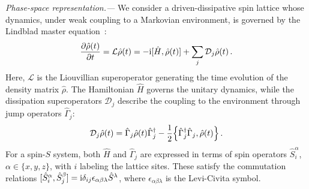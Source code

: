 \documentclass[aps,prl,twocolumn,superscriptaddress,english,floatfix]{revtex4-2}
\let\originalleft\left
\let\originalright\right
\renewcommand{\left}{\mathopen{}\mathclose\bgroup\originalleft}
\renewcommand{\right}{\aftergroup\egroup\originalright}
\def\rmi{{\rm {i}}}
\newcommand{\rhohat}{\hat{\rho}}
\newcommand{\Hhat}{\hat{H}}
\newcommand{\Shat}{\hat{S}}
\begin{document}
{\it Phase-space representation.---}
We consider a driven-dissipative spin lattice whose dynamics, under weak coupling to a Markovian environment, is governed by the Lindblad master equation~\cite{Breuer2002, Fazio2025}:
\begin{equation}\label{eq:Lindblad}
    \frac {\partial \hat \rho(t)} {\partial t} = \mathcal{L} \hat \rho(t) = - \rmi [\hat H, \hat \rho(t) ] + 
    \sum_j \mathcal{D}_j\hat \rho(t)\,.
\end{equation}
Here, $\mathcal L$ is the Liouvillian superoperator generating the time evolution of the density matrix $\rhohat$. The Hamiltonian $\hat H$ governs the unitary dynamics, while the dissipation superoperators $\mathcal { D}_j$ describe the coupling to the environment through jump operators $\hat \Gamma_j$:
\begin{equation}\label{eq:dissipation}
    \mathcal{ D}_j {\hat \rho(t)}=
 {\hat \Gamma_{j}} {\hat \rho(t)} \hat \Gamma_{j}^{\dagger}-\frac{1}{2}
\left\{
\hat \Gamma_{j}^{\dagger} \hat \Gamma_{j}, 
{\hat \rho(t)}
\right\}\,.
\end{equation}
For a spin-$S$ system, both $\Hhat$ and $\hat\Gamma_j$ are expressed in terms of spin operators $\Shat_i^\alpha$, $\alpha \in \{x,y,z\}$, with $i$ labeling the lattice sites. These satisfy the commutation relations $[\hat S_i^\alpha, \hat S^\beta_j] = \rmi \delta_{ij}\epsilon_{\alpha\beta\lambda} \hat S^{\lambda}$, where $\epsilon_{\alpha \beta \lambda}$ is the Levi-Civita symbol.
\end{document}
